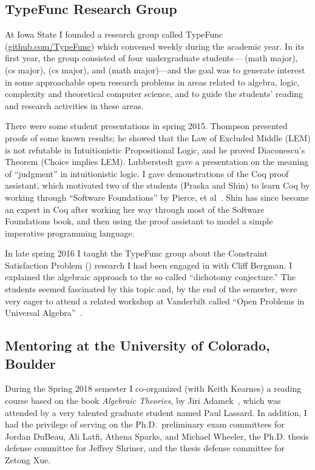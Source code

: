 \bigskip

\subsection{TypeFunc Research Group} \label{sec:typef-rese-group} At Iowa State I founded a research group called TypeFunc (\href{https://github.com/TypeFunc/}{github.com/TypeFunc}) which convened weekly during the academic year.  In its first year, the group consisted of four undergraduate students--- (math major),  (cs major),  (cs major), and  (math major)---and the goal was to generate interest in some approachable open research problems in areas related to algebra, logic, complexity and theoretical computer science, and to guide the students' reading and research activities in these areas.


There were some student presentations in spring 2015. Thompson presented proofs of some known results; he showed that the Law of Excluded Middle (LEM) is not refutable in Intuitionistic Propositional Logic, and he proved Diaconescu's Theorem (Choice implies LEM). Lubberstedt gave a presentation on the meaning of ``judgment'' in intuitionistic logic. I gave demonstrations of the Coq proof assistant, which motivated two of the students (Praska and Shin) to learn Coq by working through ``Software Foundations'' by Pierce, et al~\cite{Pierce:SF}. Shin has since become an expert in Coq after working her way through most of the Software Foundations book, and then using the proof assistant to model a simple imperative programming language.


In late spring 2016 I taught the TypeFunc group about the Constraint Satisfaction Problem (\csp) research I had been engaged in with Cliff Bergman. I explained the algebraic approach to the so called ``\csp dichotomy conjecture.'' The students seemed fascinated by this topic and, by the end of the semester, were very eager to attend a related workshop at Vanderbilt called ``Open Problems in Universal Algebra''~\cite{Shanks}.

\bigskip

\subsection{Mentoring at the University of Colorado, Boulder} During the Spring 2018 semester I co-organized (with Keith Kearnes) a reading course based on the book \emph{Algebraic Theories}, by Jiri Adamek~\cite{MR2757312}, which was attended by a very talented graduate student named Paul Lassard.  In addition, I had the privilege of serving on the Ph.D.~preliminary exam committees for Jordan DuBeau, Ali Latfi, Athena Sparks, and Michael Wheeler, the Ph.D. thesis defense committee for Jeffrey Shriner, and the thesis defense committee for Zetong Xue.


